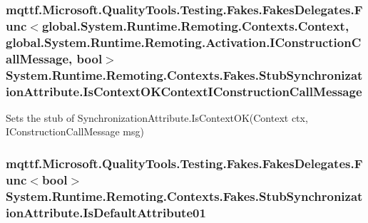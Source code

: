 \hypertarget{class_system_1_1_runtime_1_1_remoting_1_1_contexts_1_1_fakes_1_1_stub_synchronization_attribute_ab176e13a9fd316e47f2aaa6c2d781b95}{
\subsubsection[{Is\-Context\-O\-K\-Context\-I\-Construction\-Call\-Message}]{\setlength{\rightskip}{0pt plus 5cm}mqttf.\-Microsoft.\-Quality\-Tools.\-Testing.\-Fakes.\-Fakes\-Delegates.\-Func$<$global.\-System.\-Runtime.\-Remoting.\-Contexts.\-Context, global.\-System.\-Runtime.\-Remoting.\-Activation.\-I\-Construction\-Call\-Message, bool$>$ System.\-Runtime.\-Remoting.\-Contexts.\-Fakes.\-Stub\-Synchronization\-Attribute.\-Is\-Context\-O\-K\-Context\-I\-Construction\-Call\-Message}}\label{class_system_1_1_runtime_1_1_remoting_1_1_contexts_1_1_fakes_1_1_stub_synchronization_attribute_ab176e13a9fd316e47f2aaa6c2d781b95}


Sets the stub of Synchronization\-Attribute.\-Is\-Context\-O\-K(\-Context ctx, I\-Construction\-Call\-Message msg)

\hypertarget{class_system_1_1_runtime_1_1_remoting_1_1_contexts_1_1_fakes_1_1_stub_synchronization_attribute_a6625ac51a6c15ec7ec9d458878ef24b5}{
\subsubsection[{Is\-Default\-Attribute01}]{\setlength{\rightskip}{0pt plus 5cm}mqttf.\-Microsoft.\-Quality\-Tools.\-Testing.\-Fakes.\-Fakes\-Delegates.\-Func$<$bool$>$ System.\-Runtime.\-Remoting.\-Contexts.\-Fakes.\-Stub\-Synchronization\-Attribute.\-Is\-Default\-Attribute01}}\label{class_system_1_1_runtime_1_1_remoting_1_1_contexts_1_1_fakes_1_1_stub_synchronization_attribute_a6625ac51a6c15ec7ec9d458878ef24b5}


